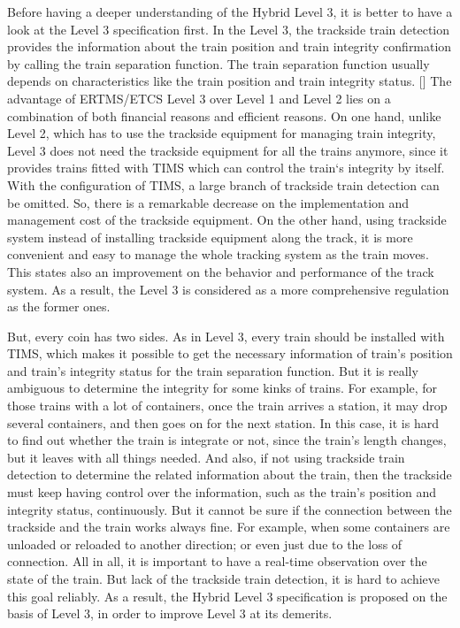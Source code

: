 \documentclass[article,dr=phil,type=drfinal,colorback,accentcolor=tud9c]{tudthesis}
\begin{document}
  Before having a deeper understanding of the Hybrid Level 3, it is better to have a look at the Level 3 specification first. In the Level 3, the trackside train detection provides the information about the train position and train integrity confirmation by calling the train separation function. The train separation function usually depends on characteristics like the train position and train integrity status. [] The advantage of ERTMS/ETCS Level 3 over Level 1 and Level 2 lies on a combination of both financial reasons and efficient reasons. On one hand, unlike Level 2, which has to use the trackside equipment for managing train integrity, Level 3 does not need the trackside equipment for all the trains anymore, since it provides trains fitted with TIMS which can control the train‘s integrity by itself. With the configuration of TIMS, a large branch of trackside train detection can be omitted. So, there is a remarkable decrease on the implementation and management cost of the trackside equipment. On the other hand, using trackside system instead of installing trackside equipment along the track, it is more convenient and easy to manage the whole tracking system as the train moves. This states also an improvement on the behavior and performance of the track system. As a result, the Level 3 is considered as a more comprehensive regulation as the former ones.
  
  But, every coin has two sides. As in Level 3, every train should be installed with TIMS, which makes it possible to get the necessary information of train's position and train's integrity status for the train separation function. But it is really ambiguous to determine the integrity for some kinks of trains. For example, for those trains with a lot of containers, once the train arrives a station, it may drop several containers, and then goes on for the next station. In this case, it is hard to find out whether the train is integrate or not, since the train's length changes, but it leaves with all things needed. And also, if not using trackside train detection to determine the related information about the train, then the trackside must keep having control over the information, such as the train's position and integrity status, continuously. But it cannot be sure if the connection between the trackside and the train works always fine. For example, when some containers are unloaded or reloaded to another direction; or even just due to the loss of connection. All in all, it is important to have a real-time observation over the state of the train. But lack of the trackside train detection, it is hard to achieve this goal reliably. As a result, the Hybrid Level 3 specification is proposed on the basis of Level 3, in order to improve Level 3 at its demerits.
  
\end{document}
